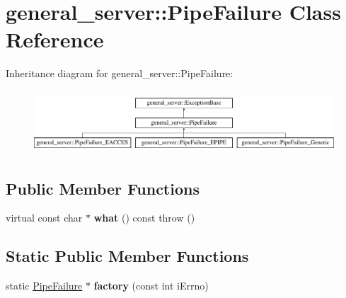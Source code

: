 \hypertarget{classgeneral__server_1_1PipeFailure}{\section{general\-\_\-server\-:\-:\-Pipe\-Failure \-Class \-Reference}
\label{classgeneral__server_1_1PipeFailure}
}
\-Inheritance diagram for general\-\_\-server\-:\-:\-Pipe\-Failure\-:\begin{figure}[H]
\begin{center}
\leavevmode
\includegraphics[height=2.372881cm]{classgeneral__server_1_1PipeFailure}
\end{center}
\end{figure}
\subsection*{\-Public \-Member \-Functions}
\begin{DoxyCompactItemize}
\item 
\hypertarget{classgeneral__server_1_1PipeFailure_a3ac149e593405b9a16519ed430dde50b}{virtual const char $\ast$ {\bfseries what} () const   throw ()}\label{classgeneral__server_1_1PipeFailure_a3ac149e593405b9a16519ed430dde50b}

\end{DoxyCompactItemize}
\subsection*{\-Static \-Public \-Member \-Functions}
\begin{DoxyCompactItemize}
\item 
\hypertarget{classgeneral__server_1_1PipeFailure_aa08eef7976293fc9f2edcb5e910b8533}{static \hyperlink{classgeneral__server_1_1PipeFailure}{\-Pipe\-Failure} $\ast$ {\bfseries factory} (const int i\-Errno)}\label{classgeneral__server_1_1PipeFailure_aa08eef7976293fc9f2edcb5e910b8533}

\end{DoxyCompactItemize}

